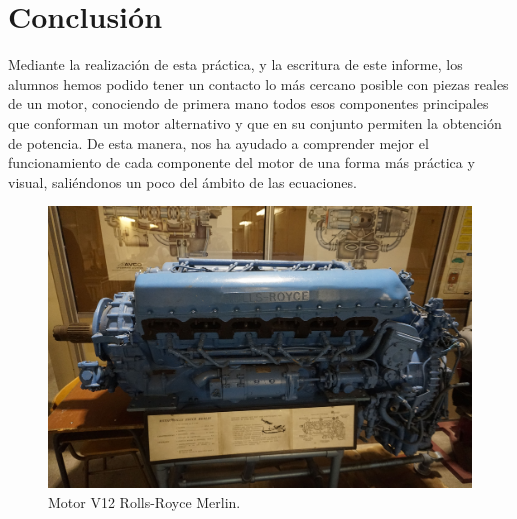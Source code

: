 

\newpage

\section{Conclusión} \label{s:conclusion}

Mediante la realización de esta práctica, y la escritura de este informe, los alumnos hemos podido tener un contacto lo más cercano posible con piezas reales de un motor, conociendo de primera mano todos esos componentes principales que conforman un motor alternativo y que en su conjunto permiten la obtención de potencia. De esta manera, nos ha ayudado a comprender mejor el funcionamiento de cada componente del motor de una forma más práctica y visual, saliéndonos un poco del ámbito de las ecuaciones.


\begin{figure}[H]
	\centering
	\includegraphics[width=0.6\linewidth]{Figures/02/extra/merlin.jpg}
	\caption{Motor V12 Rolls-Royce Merlin.}
	\label{fig:merlin}
\end{figure}





